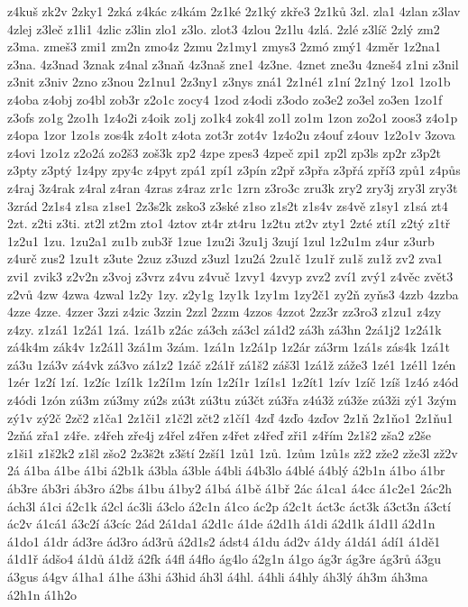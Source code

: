 z4kuš
zk2v
2zky1
2zká
z4kác
z4kám
2z1ké
2z1ký
zkře3
2z1ků
3zl.
zla1
4zlan
z3lav
4zlej
z3leč
z1li1
4zlic
z3lin
zlo1
z3lo.
zlot3
4zlou
2z1lu
4zlá.
2zlé
z3líč
2zlý
zm2
z3ma.
zmeš3
zmi1
zm2n
zmo4z
2zmu
2z1my1
zmys3
2zmó
zmý1
4změr
1z2na1
z3na.
4z3nad
3znak
z4nal
z3naň
4z3naš
zne1
4z3ne.
4znet
zne3u
4zneš4
z1ni
z3nil
z3nit
z3niv
2zno
z3nou
2z1nu1
2z3ny1
z3nys
zná1
2z1né1
z1ní
2z1ný
1zo1
1zo1b
z4oba
z4obj
zo4bl
zob3r
z2o1c
zocy4
1zod
z4odi
z3odo
zo3e2
zo3el
zo3en
1zo1f
z3ofs
zo1g
2zo1h
1z4o2i
z4oik
zo1j
zo1k4
zok4l
zo1l
zo1m
1zon
zo2o1
zoos3
z4o1p
z4opa
1zor
1zo1s
zos4k
z4o1t
z4ota
zot3r
zot4v
1z4o2u
z4ouf
z4ouv
1z2o1v
3zova
z4ovi
1zo1z
z2o2á
zo2š3
zoš3k
zp2
4zpe
zpes3
4zpeč
zpi1
zp2l
zp3ls
zp2r
z3p2t
z3pty
z3ptý
1z4py
zpy4c
z4pyt
zpá1
zpí1
z3pín
z2př
z3přa
z3přá
zpří3
způ1
z4půs
z4raj
3z4rak
z4ral
z4ran
4zras
z4raz
zr1c
1zrn
z3ro3c
zru3k
zry2
zry3j
zry3l
zry3t
3zrád
2z1s4
z1sa
z1se1
2z3s2k
zsko3
z3ské
z1so
z1s2t
z1s4v
zs4vě
z1sy1
z1sá
zt4
2zt.
z2ti
z3ti.
zt2l
zt2m
zto1
4ztov
zt4r
zt4ru
1z2tu
zt2v
zty1
2zté
ztí1
z2tý
z1tř
1z2u1
1zu.
1zu2a1
zu1b
zub3ř
1zue
1zu2i
3zu1j
3zují
1zul
1z2u1m
z4ur
z3urb
z4urč
zus2
1zu1t
z3ute
2zuz
z3uzd
z3uzl
1zu2á
2zu1č
1zu1ř
zu1š
zu1ž
zv2
zva1
zvi1
zvik3
z2v2n
z3voj
z3vrz
z4vu
z4vuč
1zvy1
4zvyp
zvz2
zví1
zvý1
z4věc
zvět3
z2vů
4zw
4zwa
4zwal
1z2y
1zy.
z2y1g
1zy1k
1zy1m
1zy2č1
zy2ň
zyňs3
4zzb
4zzba
4zze
4zze.
4zzer
3zzi
z4zic
3zzin
2zzl
2zzm
4zzos
4zzot
2zz3r
zz3ro3
z1zu1
z4zy
z4zy.
z1zá1
1z2á1
1zá.
1zá1b
z2ác
zá3ch
zá3cl
zá1d2
zá3h
zá3hn
2zá1j2
1z2á1k
zá4k4m
zák4v
1z2á1l
3zá1m
3zám.
1zá1n
1z2á1p
1z2ár
zá3rm
1zá1s
zás4k
1zá1t
zá3u
1zá3v
zá4vk
zá3vo
zá1z2
1záč
z2á1ř
zá1š2
záš3l
1zá1ž
záže3
1zé1
1zé1l
1zén
1zér
1z2í
1zí.
1z2íc
1zí1k
1z2í1m
1zín
1z2í1r
1zí1s1
1z2ít1
1zív
1zíč
1zíš
1z4ó
z4ód
z4ódi
1zón
zú3m
zú3my
zú2s
zú3t
zú3tu
zú3čt
zú3řa
z4ú3ž
zú3že
zú3ži
zý1
3zým
zý1v
zý2č
2zč2
z1ča1
2z1či1
z1č2l
zčt2
z1čí1
4zď
4zďo
4zďov
2z1ň
2z1ňo1
2z1ňu1
2zňá
zřa1
z4ře.
z4řeh
zře4j
z4řel
z4řen
z4řet
z4řeď
zři1
z4řím
2z1š2
zša2
z2še
z1ši1
z1š2k2
z1šl
zšo2
2z3š2t
z3ští
2zší1
1zů1
1zů.
1zům
1zů1s
zž2
zže2
zže3l
zž2v
2á
á1ba
á1be
á1bi
á2b1k
á3bla
á3ble
á4bli
á4b3lo
á4blé
á4blý
á2b1n
á1bo
á1br
áb3re
áb3ri
áb3ro
á2bs
á1bu
á1by2
á1bá
á1bě
á1bř
2ác
á1ca1
á4cc
á1c2e1
2ác2h
ách3l
á1ci
á2c1k
á2cl
ác3li
á3clo
á2c1n
á1co
ác2p
á2c1t
áct3c
áct3k
á3ct3n
á3ctí
ác2v
á1cá1
á3c2í
á3cíc
2ád
2á1da1
á2d1c
á1de
á2d1h
á1di
á2d1k
á1d1l
á2d1n
á1do1
á1dr
ád3re
ád3ro
ád3rů
á2d1s2
ádst4
á1du
ád2v
á1dy
á1dá1
ádí1
á1dě1
á1d1ř
ádšo4
á1dů
á1dž
á2fk
á4fl
á4flo
ág4lo
á2g1n
á1go
ág3r
ág3re
ág3rů
á3gu
á3gus
á4gv
á1ha1
á1he
á3hi
á3hid
áh3l
á4hl.
á4hli
á4hly
áh3lý
áh3m
áh3ma
á2h1n
á1h2o
